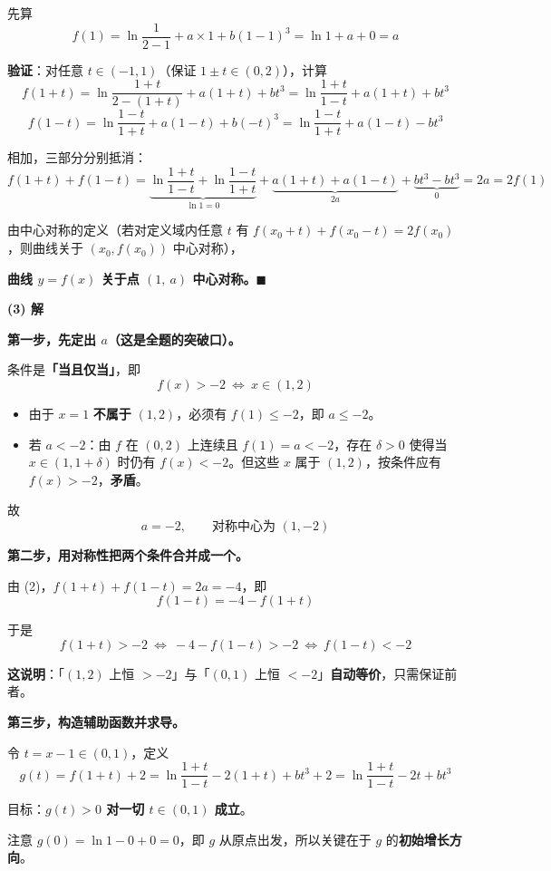 先算
\[f(1)=\ln\frac1{2-1}+a\times1+b(1-1)^{3}=\ln1+a+0=a\]

\textbf{验证}：对任意 $t\in(-1,1)$（保证 $1\pm t\in(0,2)$），计算
\[f(1+t)=\ln\frac{1+t}{2-(1+t)}+a(1+t)+bt^{3}=\ln\frac{1+t}{1-t}+a(1+t)+bt^{3}\]
\[f(1-t)=\ln\frac{1-t}{1+t}+a(1-t)+b(-t)^{3}=\ln\frac{1-t}{1+t}+a(1-t)-bt^{3}\]

相加，三部分分别抵消：
\[f(1+t)+f(1-t)=\underbrace{\ln\frac{1+t}{1-t}+\ln\frac{1-t}{1+t}}_{\ln1=0}+\underbrace{a(1+t)+a(1-t)}_{2a}+\underbrace{bt^{3}-bt^{3}}_{0}=2a=2f(1)\]

由中心对称的定义（若对定义域内任意 $t$ 有 $f\left(x_0+t\right)+f\left(x_0-t\right)=2f\left(x_0\right)$，则曲线关于 $\left(x_0,f\left(x_0\right)\right)$ 中心对称），

\textbf{曲线 $y=f(x)$ 关于点 $(1,\ a)$ 中心对称。$\blacksquare$}

\par\medskip

\textbf{(3) 解}

\textbf{第一步，先定出 $a$（这是全题的突破口）。}

条件是\textbf{「当且仅当」}，即
\[f(x)>-2\ \Longleftrightarrow\ x\in(1,2)\]

\begin{itemize}
\item 由于 $x=1$ \textbf{不属于} $(1,2)$，必须有 $f(1)\le-2$，即 $a\le-2$。
\item 若 $a<-2$：由 $f$ 在 $(0,2)$ 上连续且 $f(1)=a<-2$，存在 $\delta>0$ 使得当 $x\in(1,1+\delta)$ 时仍有 $f(x)<-2$。但这些 $x$ 属于 $(1,2)$，按条件应有 $f(x)>-2$，\textbf{矛盾}。
\end{itemize}

故
\[a=-2,\qquad\text{对称中心为 }(1,-2)\]

\textbf{第二步，用对称性把两个条件合并成一个。}

由 (2)，$f(1+t)+f(1-t)=2a=-4$，即
\[f(1-t)=-4-f(1+t)\]

于是
\[f(1+t)>-2\ \Longleftrightarrow\ -4-f(1-t)>-2\ \Longleftrightarrow\ f(1-t)<-2\]

\textbf{这说明}：「$(1,2)$ 上恒 $>-2$」与「$(0,1)$ 上恒 $<-2$」\textbf{自动等价}，只需保证前者。

\textbf{第三步，构造辅助函数并求导。}

令 $t=x-1\in(0,1)$，定义
\[g(t)=f(1+t)+2=\ln\frac{1+t}{1-t}-2(1+t)+bt^{3}+2=\ln\frac{1+t}{1-t}-2t+bt^{3}\]

目标：\textbf{$g(t)>0$ 对一切 $t\in(0,1)$ 成立}。

注意 $g(0)=\ln1-0+0=0$，即 $g$ 从原点出发，所以关键在于 $g$ 的\textbf{初始增长方向}。

